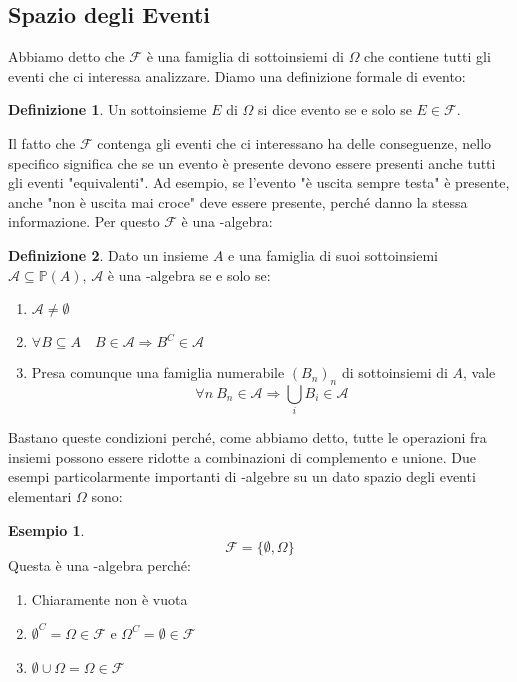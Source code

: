 \documentclass{article}
\theoremstyle{plain}
\theoremstyle{definition}
\newtheorem{definizione}{Definizione}[section]
\newtheorem{esempio}{Esempio}[section]
\theoremstyle{remark}
\begin{document}
\subsection{Spazio degli Eventi} %
\label{sub:spazio_degli_eventi}
Abbiamo detto che $\mathscr{F}$ è una famiglia di sottoinsiemi di $\Omega$ che contiene tutti gli eventi che ci interessa analizzare. Diamo una definizione formale di evento:
\begin{definizione}
	Un sottoinsieme $E$ di $\Omega$ si dice evento se e solo se $E\in\mathscr{F}$.
\end{definizione}
Il fatto che $\mathscr{F}$ contenga gli eventi che ci interessano ha delle conseguenze, nello specifico significa che se un evento è presente devono essere presenti anche tutti gli eventi "equivalenti". Ad esempio, se l'evento "è uscita sempre testa" è presente, anche "non è uscita mai croce" deve essere presente, perché danno la stessa informazione. Per questo $\mathscr{F}$ è una \sigma-algebra:
\begin{definizione}
	Dato un insieme $A$ e una famiglia di suoi sottoinsiemi $\mathscr{A}\subseteq\mathds{P}(A)$, $\mathscr{A}$ è una \sigma-algebra se e solo se:
	\begin{enumerate}
		\item $\mathscr{A}\neq\emptyset$
		\item $\forall B\subseteq A\quad B\in\mathscr{A}\Rightarrow B^C\in\mathscr{A}$
		\item Presa comunque una famiglia numerabile $(B_n)_n$ di sottoinsiemi di $A$, vale
		\begin{equation*}
			\forall n\ B_n\in\mathscr{A}\Rightarrow\bigcup_i B_i\in\mathscr{A}
		\end{equation*}
	\end{enumerate}
\end{definizione}
Bastano queste condizioni perché, come abbiamo detto, tutte le operazioni fra insiemi possono essere ridotte a combinazioni di complemento e unione. Due esempi particolarmente importanti di \sigma-algebre su un dato spazio degli eventi elementari $\Omega$ sono:
\begin{esempio}
	\begin{equation*}
		\mathscr{F}=\{\emptyset, \Omega\}
	\end{equation*}
	Questa è una \sigma-algebra perché:
	\begin{enumerate}
		\item Chiaramente non è vuota
		\item $\emptyset^C=\Omega\in\mathscr{F}$ e $\Omega^C=\emptyset\in\mathscr{F}$
		\item $\emptyset\cup\Omega=\Omega\in\mathscr{F}$
	\end{enumerate}
\end{esempio}
\end{document}
